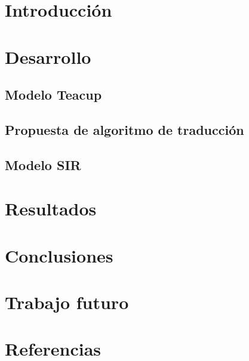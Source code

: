 \documentclass[11pt, a4paper]{article}
\begin{document}

\maketitle
\newpage

\tableofcontents
\newpage

%
\section{Introducción}


\section{Desarrollo}

\subsection{Modelo Teacup}

\subsection{Propuesta de algoritmo de traducción}


\subsection{Modelo SIR}


\section{Resultados}


\section{Conclusiones}


\section{Trabajo futuro}


\section{Referencias}


\clearpage
\addappheadtotoc
\appendix
\appendixpage








\end{document}
